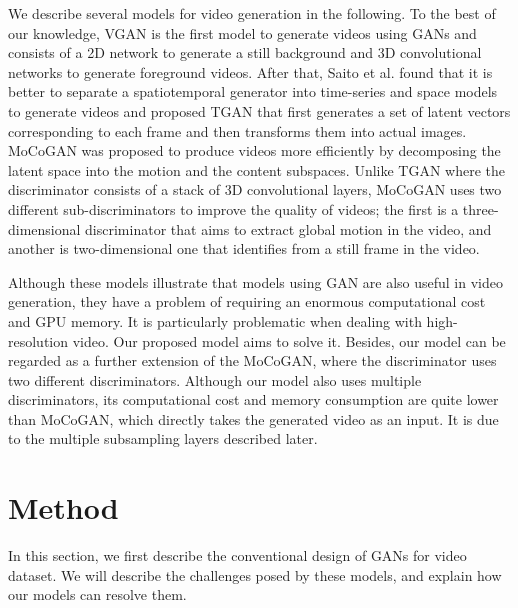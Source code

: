 \documentclass[twocolumn]{svjour3}
\begin{document}
We describe several models for video generation in the following.
To the best of our knowledge, VGAN \cite{Vondrick2016} is the first model to generate videos using GANs and consists of a 2D network to generate a still background and 3D convolutional networks to generate foreground videos.
After that, Saito et al. \cite{Saito2017} found that it is better to separate a spatiotemporal generator into time-series and space models to generate videos and proposed TGAN that first generates a set of latent vectors corresponding to each frame and then transforms them into actual images.
MoCoGAN \cite{Tulyakov2018} was proposed to produce videos more efficiently by decomposing the latent space into the motion and the content subspaces.
Unlike TGAN where the discriminator consists of a stack of 3D convolutional layers, MoCoGAN uses two different sub-discriminators to improve the quality of videos; the first is a three-dimensional discriminator that aims to extract global motion in the video, and another is two-dimensional one that identifies from a still frame in the video.

Although these models illustrate that models using GAN are also useful in video generation, they have a problem of requiring an enormous computational cost and GPU memory. It is particularly problematic when dealing with high-resolution video. Our proposed model aims to solve it.
Besides, our model can be regarded as a further extension of the MoCoGAN, where the discriminator uses two different discriminators.
Although our model also uses multiple discriminators, its computational cost and memory consumption are quite lower than MoCoGAN, which directly takes the generated video as an input. It is due to the multiple subsampling layers described later.


\section{Method}

In this section, we first describe the conventional design of GANs for video dataset.
We will describe the challenges posed by these models, and explain how our models can resolve them.
\end{document}
